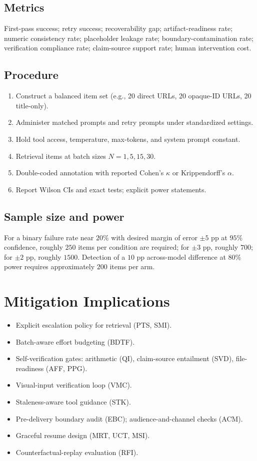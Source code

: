 \documentclass[11pt]{article}
\begin{document}
\subsection{Metrics}
First-pass success; retry success; recoverability gap; artifact-readiness rate; numeric consistency rate; placeholder leakage rate; boundary-contamination rate; verification compliance rate; claim-source support rate; human intervention cost.

\subsection{Procedure}
\begin{enumerate}[leftmargin=*, label=\arabic*.]
  \item Construct a balanced item set (e.g., 20 direct URLs, 20 opaque-ID URLs, 20 title-only).
  \item Administer matched prompts and retry prompts under standardized settings.
  \item Hold tool access, temperature, max-tokens, and system prompt constant.
  \item Retrieval items at batch sizes $N=1,5,15,30$.
  \item Double-coded annotation with reported Cohen's $\kappa$ or Krippendorff's $\alpha$.
  \item Report Wilson CIs and exact tests; explicit power statements.
\end{enumerate}

\subsection{Sample size and power}
For a binary failure rate near $20\%$ with desired margin of error $\pm 5$ pp at $95\%$ confidence, roughly $250$ items per condition are required; for $\pm 3$ pp, roughly $700$; for $\pm 2$ pp, roughly $1500$. Detection of a $10$ pp across-model difference at $80\%$ power requires approximately $200$ items per arm.

\section{Mitigation Implications}
\begin{itemize}[leftmargin=*]
  \item Explicit escalation policy for retrieval (PTS, SMI).
  \item Batch-aware effort budgeting (BDTF).
  \item Self-verification gates: arithmetic (QI), claim-source entailment (SVD), file-readiness (AFF, PPG).
  \item Visual-input verification loop (VMC).
  \item Staleness-aware tool guidance (STK).
  \item Pre-delivery boundary audit (EBC); audience-and-channel checks (ACM).
  \item Graceful resume design (MRT, UCT, MSI).
  \item Counterfactual-replay evaluation (RFI).
\end{itemize}
\end{document}
